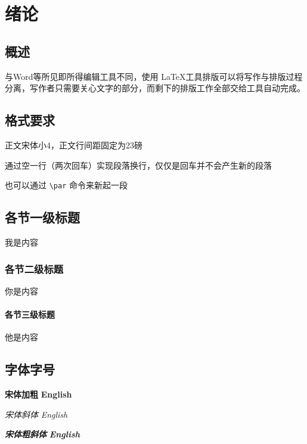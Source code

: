 
\chapter{绪论}

\section{概述}

与Word等所见即所得编辑工具不同，使用 \LaTeX 工具排版可以将写作与排版过程分离，写作者只需要关心文字的部分，而剩下的排版工作全部交给工具自动完成。

\section{格式要求}
正文宋体小4，正文行间距固定为23磅

通过空一行（两次回车）实现段落换行，仅仅是回车并不会产生新的段落 \par

也可以通过 \verb|\par| 命令来新起一段

\section{各节一级标题}
我是内容

\subsection{各节二级标题}
你是内容

\subsubsection{各节三级标题}
他是内容

\section{字体字号}
{\songti \bfseries 宋体加粗} {\textbf{English}}

{\songti \itshape 宋体斜体} {\textit{English}}

{\songti \bfseries \itshape 宋体粗斜体} {\textbf{\textit{English}}}